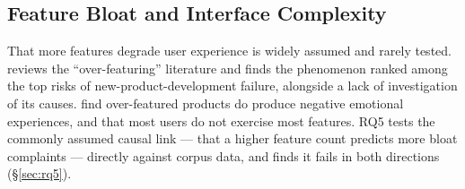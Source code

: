 \subsection{Feature Bloat and Interface Complexity}

That more features degrade user experience is widely assumed and rarely
tested. \citet{marzi2022overfeaturing} reviews the ``over-featuring''
literature and finds the phenomenon ranked among the top risks of
new-product-development failure, alongside a lack of investigation of its
causes. \citet{blackler2016rtfm} find over-featured products do produce
negative emotional experiences, and that most users do not exercise most
features. RQ5 tests the commonly assumed causal link --- that a higher feature
count predicts more bloat complaints --- directly against corpus data, and
finds it fails in both directions (\S\ref{sec:rq5}).
